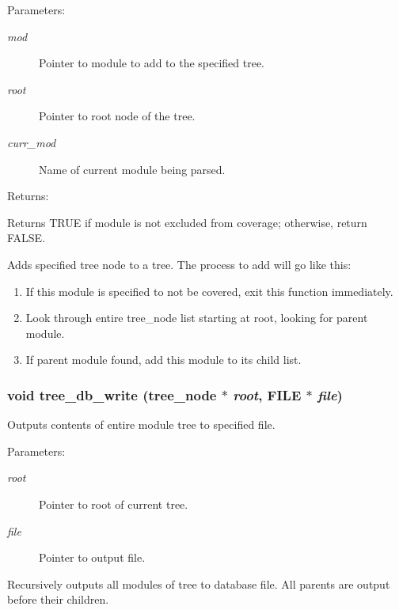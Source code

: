 \begin{Desc}
\item[Parameters: ]\par
\begin{description}
\item[{\em 
mod}]Pointer to module to add to the specified tree. \item[{\em 
root}]Pointer to root node of the tree. \item[{\em 
curr\_\-mod}]Name of current module being parsed. \end{description}
\end{Desc}
\begin{Desc}
\item[Returns: ]\par
Returns TRUE if module is not excluded from coverage; otherwise, return FALSE.\end{Desc}
Adds specified tree node to a tree. The process to add will go like this:\begin{enumerate}
\item 
If this module is specified to not be covered, exit this function immediately.\item 
Look through entire tree\_\-node list starting at root, looking for parent module.\item 
If parent module found, add this module to its child list. \end{enumerate}
\subsubsection{\setlength{\rightskip}{0pt plus 5cm}void tree\_\-db\_\-write ({\bf tree\_\-node} $\ast$ {\em root}, FILE $\ast$ {\em file})}\label{tree_8h_a3}


Outputs contents of entire module tree to specified file.

\begin{Desc}
\item[Parameters: ]\par
\begin{description}
\item[{\em 
root}]Pointer to root of current tree. \item[{\em 
file}]Pointer to output file.\end{description}
\end{Desc}
Recursively outputs all modules of tree to database file. All parents are output before their children. 
